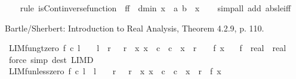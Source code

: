 \begin{isabellebody}
%
\isadelimproof
\ \ %
\endisadelimproof
%
\isatagproof
{}\isamarkupfalse%
\ {\isacharparenleft}{\kern0pt}rule\ isCont{\isacharunderscore}{\kern0pt}inverse{\isacharunderscore}{\kern0pt}function\ {\isacharbrackleft}{\kern0pt}\ f{\isacharequal}{\kern0pt}f\ \ d{\isacharequal}{\kern0pt}{\isachardoublequoteopen}min\ {\isacharparenleft}{\kern0pt}x\ {\isacharminus}{\kern0pt}\ a{\isacharparenright}{\kern0pt}\ {\isacharparenleft}{\kern0pt}b\ {\isacharminus}{\kern0pt}\ x{\isacharparenright}{\kern0pt}{\isachardoublequoteclose}{\isacharbrackright}{\kern0pt}{\isacharparenright}{\kern0pt}\isanewline
\ \ \isamarkupfalse%
\ {\isacharparenleft}{\kern0pt}simp{\isacharunderscore}{\kern0pt}all\ add{\isacharcolon}{\kern0pt}\ abs{\isacharunderscore}{\kern0pt}le{\isacharunderscore}{\kern0pt}iff{\isacharparenright}{\kern0pt}\isanewline
\ \ \isamarkupfalse%
%
\endisatagproof
{\isafoldproof}%
%
\isadelimproof
%
\endisadelimproof
%
\begin{isamarkuptext}%
Bartle/Sherbert: Introduction to Real Analysis, Theorem 4.2.9, p. 110.%
\end{isamarkuptext}\isamarkuptrue%
\isamarkupfalse%
\ LIM{\isacharunderscore}{\kern0pt}fun{\isacharunderscore}{\kern0pt}gt{\isacharunderscore}{\kern0pt}zero{\isacharcolon}{\kern0pt}\ {\isachardoublequoteopen}f\ {\isasymmidarrow}c{\isasymrightarrow}\ l\ {\isasymLongrightarrow}\ {}\ {\isacharless}{\kern0pt}\ l\ {\isasymLongrightarrow}\ {\isasymexists}r{\isachardot}{\kern0pt}\ {}\ {\isacharless}{\kern0pt}\ r\ {\isasymand}\ {\isacharparenleft}{\kern0pt}{\isasymforall}x{\isachardot}{\kern0pt}\ x\ {\isasymnoteq}\ c\ {\isasymand}\ {\isasymbar}c\ {\isacharminus}{\kern0pt}\ x{\isasymbar}\ {\isacharless}{\kern0pt}\ r\ {\isasymlongrightarrow}\ {}\ {\isacharless}{\kern0pt}\ f\ x{\isacharparenright}{\kern0pt}{\isachardoublequoteclose}\isanewline
\ \ \ f\ {\isacharcolon}{\kern0pt}{\isacharcolon}{\kern0pt}\ {\isachardoublequoteopen}real\ {\isasymRightarrow}\ real{\isachardoublequoteclose}\isanewline
%
\isadelimproof
\ \ %
\endisadelimproof
%
\isatagproof
{}\isamarkupfalse%
\ {\isacharparenleft}{\kern0pt}force\ simp{\isacharcolon}{\kern0pt}\ dest{\isacharcolon}{\kern0pt}\ LIM{\isacharunderscore}{\kern0pt}D{\isacharparenright}{\kern0pt}%
\endisatagproof
{\isafoldproof}%
%
\isadelimproof
\isanewline
%
\endisadelimproof
\isanewline
{}\isamarkupfalse%
\ LIM{\isacharunderscore}{\kern0pt}fun{\isacharunderscore}{\kern0pt}less{\isacharunderscore}{\kern0pt}zero{\isacharcolon}{\kern0pt}\ {\isachardoublequoteopen}f\ {\isasymmidarrow}c{\isasymrightarrow}\ l\ {\isasymLongrightarrow}\ l\ {\isacharless}{\kern0pt}\ {}\ {\isasymLongrightarrow}\ {\isasymexists}r{\isachardot}{\kern0pt}\ {}\ {\isacharless}{\kern0pt}\ r\ {\isasymand}\ {\isacharparenleft}{\kern0pt}{\isasymforall}x{\isachardot}{\kern0pt}\ x\ {\isasymnoteq}\ c\ {\isasymand}\ {\isasymbar}c\ {\isacharminus}{\kern0pt}\ x{\isasymbar}\ {\isacharless}{\kern0pt}\ r\ {\isasymlongrightarrow}\ f\ x\ {\isacharless}{\kern0pt}\ {}{\isacharparenright}{\kern0pt}{\isachardoublequoteclose}\isanewline

\end{isabellebody}

